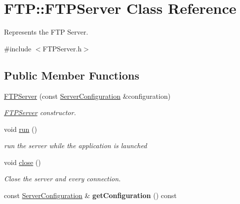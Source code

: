 \hypertarget{classFTP_1_1FTPServer}{}\section{F\+T\+P\+:\+:F\+T\+P\+Server Class Reference}
\label{classFTP_1_1FTPServer}


Represents the F\+T\+P Server.  




{\ttfamily \#include $<$F\+T\+P\+Server.\+h$>$}

\subsection*{Public Member Functions}
\begin{DoxyCompactItemize}
\item 
\hyperlink{classFTP_1_1FTPServer_a8ea3b0bab4f4991de8060c7741ef84b2}{F\+T\+P\+Server} (const \hyperlink{classFTP_1_1ServerConfiguration}{Server\+Configuration} \&configuration)
\begin{DoxyCompactList}\small\item\em \hyperlink{classFTP_1_1FTPServer}{F\+T\+P\+Server} constructor. \end{DoxyCompactList}\item 
void \hyperlink{classFTP_1_1FTPServer_ac484c041ac5c602c6a0e5eb77b4c2828}{run} ()
\begin{DoxyCompactList}\small\item\em run the server while the application is launched \end{DoxyCompactList}\item 
\hypertarget{classFTP_1_1FTPServer_a3606447f498e487d2ab498dfddb62422}{}void \hyperlink{classFTP_1_1FTPServer_a3606447f498e487d2ab498dfddb62422}{close} ()\label{classFTP_1_1FTPServer_a3606447f498e487d2ab498dfddb62422}

\begin{DoxyCompactList}\small\item\em Close the server and every connection. \end{DoxyCompactList}\item 
\hypertarget{classFTP_1_1FTPServer_a505cd213609eccfa11d806562010d13f}{}const \hyperlink{classFTP_1_1ServerConfiguration}{Server\+Configuration} \& {\bfseries get\+Configuration} () const \label{classFTP_1_1FTPServer_a505cd213609eccfa11d806562010d13f}

\end{DoxyCompactItemize}


